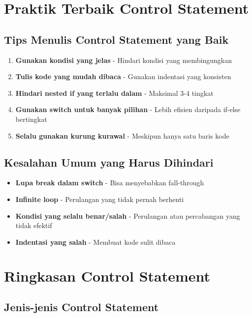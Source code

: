 \section{Praktik Terbaik Control Statement}

\subsection{Tips Menulis Control Statement yang Baik}

\begin{enumerate}
\item \textbf{Gunakan kondisi yang jelas} - Hindari kondisi yang membingungkan
\item \textbf{Tulis kode yang mudah dibaca} - Gunakan indentasi yang konsisten
\item \textbf{Hindari nested if yang terlalu dalam} - Maksimal 3-4 tingkat
\item \textbf{Gunakan switch untuk banyak pilihan} - Lebih efisien daripada if-else bertingkat
\item \textbf{Selalu gunakan kurung kurawal} - Meskipun hanya satu baris kode
\end{enumerate}

\subsection{Kesalahan Umum yang Harus Dihindari}

\begin{itemize}
\item \textbf{Lupa break dalam switch} - Bisa menyebabkan fall-through
\item \textbf{Infinite loop} - Perulangan yang tidak pernah berhenti
\item \textbf{Kondisi yang selalu benar/salah} - Perulangan atau percabangan yang tidak efektif
\item \textbf{Indentasi yang salah} - Membuat kode sulit dibaca
\end{itemize}

\section{Ringkasan Control Statement}

\subsection{Jenis-jenis Control Statement}


